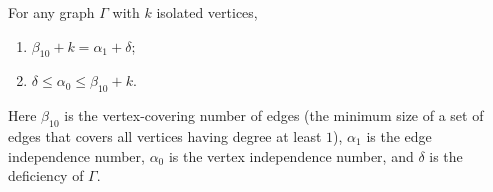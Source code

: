 For any graph $\Gamma$ with $k$ isolated vertices,
\begin{enumerate}
\item[(a)] $\beta_{10} + k = \alpha_1 + \delta$;
\item[(b)] $\delta \leq \alpha_0 \leq \beta_{10} + k$.
\end{enumerate}

Here $\beta_{10}$ is the vertex-covering number of edges (the minimum size of a set of edges that covers all vertices having degree at least $1$), $\alpha_1$ is the edge independence number, $\alpha_0$ is the vertex independence number, and $\delta$ is the deficiency of $\Gamma$.
